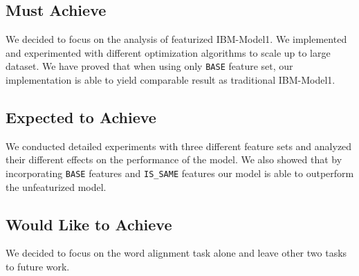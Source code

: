 \documentclass[11pt,letterpaper]{article}
\begin{document}
\subsection{Must Achieve}
We decided to focus on the analysis of featurized IBM-Model1. We implemented and experimented with different optimization algorithms to scale up to large dataset. We have proved that when using only \texttt{BASE} feature set, our implementation is able to yield comparable result as traditional IBM-Model1.

\subsection{Expected to Achieve}
We conducted detailed experiments with three different feature sets and analyzed their different effects on the performance of the model. We also showed that by incorporating \texttt{BASE} features and \texttt{IS\_SAME} features our model is able to outperform the unfeaturized model.

\subsection{Would Like to Achieve}
We decided to focus on the word alignment task alone and leave other two tasks to future work.



\end{document}
